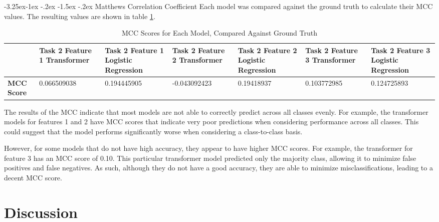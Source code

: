 \documentclass[10.7pt, onecolumn]{article}
\makeatletter
\renewcommand\subsubsection{\@startsection{subsubsection}{3}{\z@}%
	{-3.25ex\@plus -1ex \@minus -.2ex}%
    {-1.5ex \@plus -.2ex}%
    {\normalfont\itshape}}
\makeatother
\begin{document}
\subsubsection{Matthews Correlation Coefficient}
Each model was compared against the ground truth to calculate their MCC values. The resulting values are shown in table \ref{tab:mccTab}.

\begin{table}[h!]
  \centering
  \small
  \begin{tabular}{|p{1cm}|p{2cm}|p{2cm}|p{2cm}|p{2cm}|p{2cm}|p{2cm}|}
      \hline
      & \textbf{Task 2 Feature 1 Transformer} & \textbf{Task 2 Feature 1 Logistic Regression} & \textbf{Task 2 Feature 2 Transformer} & \textbf{Task 2 Feature 2 Logistic Regression} & \textbf{Task 2 Feature 3 Transformer} & \textbf{Task 2 Feature 3 Logistic Regression} \\
      \hline
      \textbf{MCC Score} & 0.066509038 & 0.194445905 & -0.043092423 & 0.19418937 & 0.103772985 & 0.124725893 \\
      \hline
  \end{tabular}
  \caption{MCC Scores for Each Model, Compared Against Ground Truth}
  \label{tab:mccTab}
\end{table}

The results of the MCC indicate that most models are not able to correctly predict across all classes evenly. For example, the transformer models for features 1 and 2 have MCC scores that indicate very poor predictions when considering performance across all classes. This could suggest that the model performs significantly worse when considering a class-to-class basis.

However, for some models that do not have high accuracy, they appear to have higher MCC scores. For example, the transformer for feature 3 has an MCC score of 0.10. This particular transformer model predicted only the majority class, allowing it to minimize false positives and false negatives. As such, although they do not have a good accuracy, they are able to minimize misclassifications, leading to a decent MCC score.

\section{Discussion}\label{discussion and conclusion}
\end{document}
